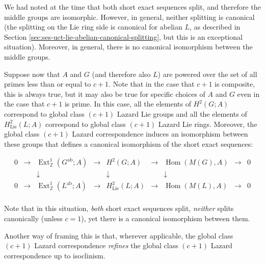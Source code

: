 \documentclass{ucetd}
\begin{document}
We had noted at the time that both short exact sequences split, and
therefore the middle groups are isomorphic. However, in general,
neither splitting is canonical (the splitting on the Lie ring side is
canonical for abelian $L$, as described in Section
\ref{sec:ses-uct-lie-abelian-canonical-splitting}, but this is an exceptional
situation). Moreover, in general, there is no canonical isomorphism
between the middle groups.

Suppose now that $A$ and $G$ (and therefore also $L$) are powered over
the set of all primes less than or equal to $c + 1$. Note that in the
case that $c + 1$ is composite, this is always true, but it may also
be true for specific choices of $A$ and $G$ even in the case that $c +
1$ is prime. In this case, all the elements of $H^2(G;A)$ correspond
to global class $(c + 1)$ Lazard Lie groups and all the elements of
$H^2_{\text{Lie}}(L;A)$ correspond to global class $(c + 1)$ Lazard
Lie rings. Moreover, the global class $(c + 1)$ Lazard correspondence
induces an isomorphism between these groups that defines a canonical
isomorphism of the short exact sequences:

$$\begin{array}{ccccccccc}
  0 &\to &\operatorname{Ext}^1_{\mathbb{Z}}(G^{\operatorname{ab}};A) &\to &H^2(G;A) &\to &\operatorname{Hom}(M(G),A) &\to &0\\
  & & \downarrow & & \downarrow & & \downarrow & & \\
  0 &\to &\operatorname{Ext}^1_{\mathbb{Z}}(L^{\operatorname{ab}};A) & \to & H^2_{\text{Lie}}(L;A) & \to & \operatorname{Hom}(M(L), A) & \to & 0\\
\end{array}$$

Note that in this situation, {\em both} short exact sequences split,
{\em neither} splits canonically (unless $c = 1$), yet there is a
canonical isomorphism between them.

Another way of framing this is that, wherever applicable, the global
class $(c + 1)$ Lazard correspondence {\em refines} the global class
$(c + 1)$ Lazard correspondence up to isoclinism.


\end{document}
